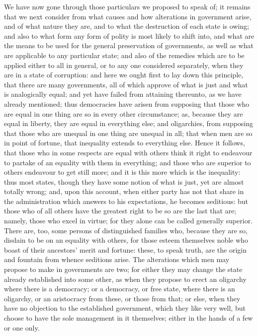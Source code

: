 We have now gone through those particulars we proposed to speak of; it
remains that we next consider from what causes and how alterations in
government arise, and of what nature they are, and to what the destruction
of each state is owing; and also to what form any form of polity is most
likely to shift into, and what are the means to be used for the general
preservation of governments, as well as what are applicable to any
particular state; and also of the remedies which are to be applied either
to all in general, or to any one considered separately, when they are in a
state of corruption: and here we ought first to lay down this principle,
that there are many governments, all of which approve of what is just and
what is analogically equal; and yet have failed from attaining thereunto,
as we have already mentioned; thus democracies have arisen from supposing
that those who are equal in one thing are so in every other circumstance;
as, because they are equal in liberty, they are equal in everything else;
and oligarchies, from supposing that those who are unequal in one thing
are unequal in all; that when men are so in point of fortune, that
inequality extends to everything else. Hence it follows, that those who in
some respects are equal with others think it right to endeavour to partake
of an equality with them in everything; and those who are superior to
others endeavour to get still more; and it is this more which is the
inequality: thus most states, though they have some notion of what is
just, yet are almost totally wrong; and, upon this account, when either
party has not that share in the administration which answers to his
expectations, he becomes seditious: but those who of all others have the
greatest right to be so are the last that are; namely, those who excel in
virtue; for they alone can be called generally superior. There are, too,
some persons of distinguished families who, because they are so, disdain
to be on an equality with others, for those esteem themselves noble who
boast of their ancestors' merit and fortune: these, to speak truth, are
the origin and fountain from whence seditions arise. The alterations which
men may propose to make in governments are two; for either they may change
the state already established into some other, as when they propose to
erect an oligarchy where there is a democracy; or a democracy, or free
state, where there is an oligarchy, or an aristocracy from these, or those
from that; or else, when they have no objection to the established
government, which they like very well, but choose to have the sole
management in it themselves; either in the hands of a few or one only.
